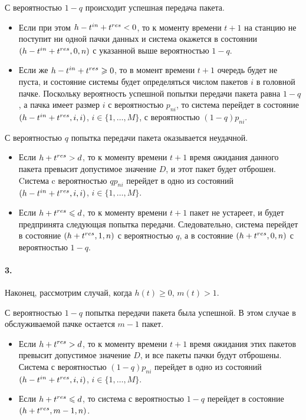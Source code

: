 С вероятностью $1 - q$ происходит успешная передача пакета.

\begin{itemize}
\item Если при этом $h - t^{in} + t^{res} < 0$, то к моменту времени $t + 1$ на станцию не поступит ни одной пачки данных и система окажется в состоянии $(h - t^{in} + t^{res}, 0, n)$ с указанной выше вероятностью $1 - q$.
\item Если же $h - t^{in} + t^{res} \geqslant 0$, то в момент времени $t + 1$ очередь будет не пуста, и состояние системы будет определяться числом пакетов $i$ в головной пачке. Поскольку вероятность успешной попытки передачи пакета равна  $1 - q$, а пачка имеет размер $i$ с вероятностью $p_{ni}$, то система перейдет в состояние $(h - t^{in} + t^{res}, i, i)$, $i \in \{1, \ldots, M\}$, с вероятностью $(1 - q)p_{ni}$.
\end{itemize} 

С вероятностью $q$ попытка передачи пакета оказывается неудачной. 

\begin{itemize}
\item Если $h + t^{res} > d$, то к моменту времени $t + 1$ время ожидания данного пакета  превысит допустимое значение $D$, и этот пакет будет отброшен. Cистема c вероятностью $qp_{ni}$ перейдет в одно из состояний $(h - t^{in} + t^{res}, i, i)$, $i \in \{1, \ldots, M\}$.
\item Если $h + t^{res} \leqslant d$, то к моменту времени $t + 1$ пакет не устареет, и будет предпринята следующая попытка передачи. Следовательно, система перейдет в состояние $(h + t^{res}, 1, n)$ с вероятностью $q$, а в состояние $(h + t^{res}, 0, n)$ с вероятностью $1 - q$.
\end{itemize} 

\paragraph{3.} Наконец, рассмотрим случай, когда $h(t) \geqslant 0$, $m(t) > 1$. 

С вероятностью $1 - q$ попытка передачи пакета была успешной. В этом случае в обслуживаемой пачке остается $m - 1$ пакет. 

\begin{itemize}
\item Если $h + t^{res} > d$, то к моменту времени $t + 1$ время ожидания этих пакетов превысит допустимое значение $D$, и все пакеты пачки будут отброшены. Система с вероятностью $(1-q)p_{ni}$ перейдет в одно из состояний $(h - t^{in} + t^{res}, i, i)$, $i \in \{1, \ldots, M\}$. 
\item Если $h + t^{res} \leqslant d$, то система с вероятностью $1-q$ перейдет в состояние $(h + t^{res}, m - 1, n)$.
\end{itemize} 

